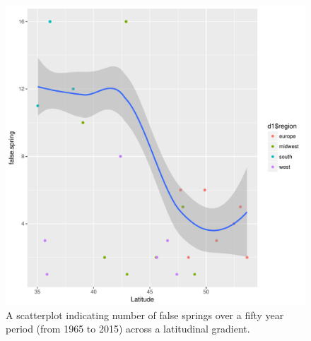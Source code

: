 \documentclass{article}\usepackage[]{graphicx}\usepackage[]{color}
\makeatletter
\def\maxwidth{ %
  \ifdim\Gin@nat@width>\linewidth
    \linewidth
  \else
    \Gin@nat@width
  \fi
}
\makeatother
\begin{document}
\begin{figure}[H]
\includegraphics[width=\maxwidth]{figure/fsifig-1} \caption[A scatterplot indicating number of false springs over a fifty year period (from 1965 to 2015) across a latitudinal gradient]{A scatterplot indicating number of false springs over a fifty year period (from 1965 to 2015) across a latitudinal gradient. }\label{fig:fsifig}
\end{figure}




\end{document}
